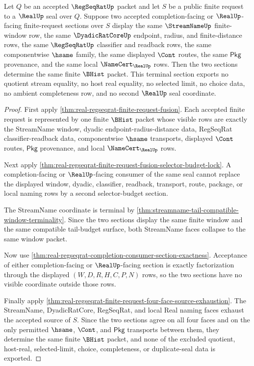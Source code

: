 \begin{theorem}
\label{thm:real-regseqrat-finite-request-section-terminality}
Let $Q$ be an accepted $\RegSeqRatUp$ packet and let $S$ be a public finite request to a $\RealUp$ seal over $Q$. Suppose two accepted completion-facing or $\RealUp$-facing finite-request sections over $S$ display the same $\StreamNameUp$ finite-window row, the same $\DyadicRatCoreUp$ endpoint, radius, and finite-distance rows, the same $\RegSeqRatUp$ classifier and readback rows, the same componentwise $\hsame$ family, the same displayed $\Cont$ routes, the same $\mathsf{Pkg}$ provenance, and the same local $\NameCert_{\RealUp}$ rows. Then the two sections determine the same finite $\BHist$ packet. This terminal section exports no quotient stream equality, no host real equality, no selected limit, no choice data, no ambient completeness row, and no second $\RealUp$ seal coordinate.
\end{theorem}
\begin{proof}
First apply \autoref{thm:real-regseqrat-finite-request-fusion}. Each accepted finite request is represented by one finite $\BHist$ packet whose visible rows are exactly the StreamName window, dyadic endpoint-radius-distance data, RegSeqRat classifier-readback data, componentwise $\hsame$ transports, displayed $\Cont$ routes, $\mathsf{Pkg}$ provenance, and local $\NameCert_{\RealUp}$ rows.

Next apply \autoref{thm:real-regseqrat-finite-request-fusion-selector-budget-lock}. A completion-facing or $\RealUp$-facing consumer of the same seal cannot replace the displayed window, dyadic, classifier, readback, transport, route, package, or local naming rows by a second selector-budget section.

The StreamName coordinate is terminal by \autoref{thm:streamname-tail-compatible-window-terminality}. Since the two sections display the same finite window and the same compatible tail-budget surface, both StreamName faces collapse to the same window packet.

Now use \autoref{thm:real-regseqrat-completion-consumer-section-exactness}. Acceptance of either completion-facing or $\RealUp$-facing section is exactly factorization through the displayed $(W,D,R,H,C,P,N)$ rows, so the two sections have no visible coordinate outside those rows.

Finally apply \autoref{thm:real-regseqrat-finite-request-four-face-source-exhaustion}. The StreamName, DyadicRatCore, RegSeqRat, and local Real naming faces exhaust the accepted source of $S$. Since the two sections agree on all four faces and on the only permitted $\hsame$, $\Cont$, and $\mathsf{Pkg}$ transports between them, they determine the same finite $\BHist$ packet, and none of the excluded quotient, host-real, selected-limit, choice, completeness, or duplicate-seal data is exported.
\end{proof}

